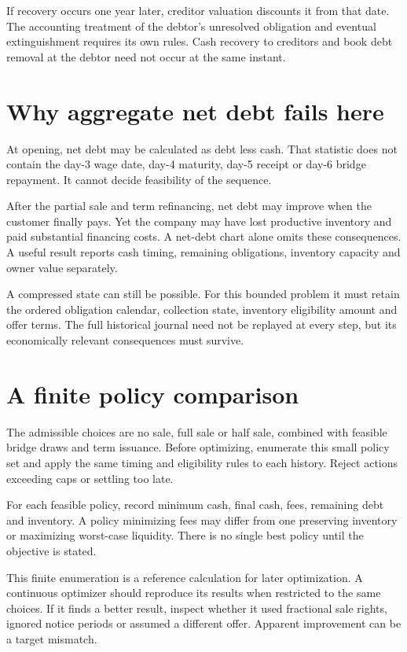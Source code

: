 If recovery occurs one year later, creditor valuation discounts it from that date. The accounting treatment of the debtor's unresolved obligation and eventual extinguishment requires its own rules. Cash recovery to creditors and book debt removal at the debtor need not occur at the same instant.

\section{Why aggregate net debt fails here}
At opening, net debt may be calculated as debt less cash. That statistic does not contain the day-3 wage date, day-4 maturity, day-5 receipt or day-6 bridge repayment. It cannot decide feasibility of the sequence.

After the partial sale and term refinancing, net debt may improve when the customer finally pays. Yet the company may have lost productive inventory and paid substantial financing costs. A net-debt chart alone omits these consequences. A useful result reports cash timing, remaining obligations, inventory capacity and owner value separately.

A compressed state can still be possible. For this bounded problem it must retain the ordered obligation calendar, collection state, inventory eligibility amount and offer terms. The full historical journal need not be replayed at every step, but its economically relevant consequences must survive.

\section{A finite policy comparison}
The admissible choices are no sale, full sale or half sale, combined with feasible bridge draws and term issuance. Before optimizing, enumerate this small policy set and apply the same timing and eligibility rules to each history. Reject actions exceeding caps or settling too late.

For each feasible policy, record minimum cash, final cash, fees, remaining debt and inventory. A policy minimizing fees may differ from one preserving inventory or maximizing worst-case liquidity. There is no single best policy until the objective is stated.

This finite enumeration is a reference calculation for later optimization. A continuous optimizer should reproduce its results when restricted to the same choices. If it finds a better result, inspect whether it used fractional sale rights, ignored notice periods or assumed a different offer. Apparent improvement can be a target mismatch.

